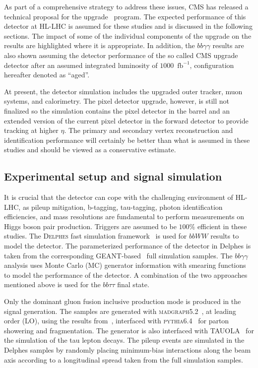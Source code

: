 As part of a comprehensive strategy to address these issues, CMS has released a technical proposal for the \phasetwo upgrade~\cite{Butler:2020886} program. The expected performance of this detector at HL-LHC is assumed for these studies and is discussed in the following sections. The impact of some of the individual components of the \phasetwo upgrade on the results are highlighted where it is appropriate. In addition, the $bb\gamma\gamma$ results are also shown assuming the detector performance of the so called \phaseone CMS upgrade~\cite{Collaboration:1355706} detector after an assumed integrated luminosity of $1000$~$\mathrm{fb}^{-1}$, configuration hereafter denoted as ``\phaseone aged''.

At present, the \phasetwo detector simulation includes the upgraded outer tracker, muon systems, and calorimetry. The pixel detector upgrade, however, is still not finalized so the simulation contains the \phaseone pixel detector in the barrel and an extended version of the current pixel detector in the forward detector to provide tracking at higher $\eta$. The primary and secondary vertex reconstruction and identification performance will certainly be better
than what is assumed in these studies and should be viewed as a conservative estimate.


\subsection{Experimental setup and signal simulation}
\label{sec:exp_cond}
It is crucial that the \phasetwo detector can cope with the challenging environment of HL-LHC, as pileup mitigation, b-tagging, tau-tagging, photon identification efficiencies, and mass 
resolutions are fundamental to perform measurements on Higgs boson pair production. Triggers are assumed to be $100\%$ efficient in these studies. The \textsc{Delphes} fast simulation framework~\cite{deFavereau:2013fsa} is used 
for $bbWW$ results to model the \phasetwo detector. The parameterized performance of the \phasetwo detector in Delphes is taken from the corresponding GEANT-based~\cite{Agostinelli:2002hh} full simulation  samples. The $bb\gamma\gamma$ analysis uses Monte Carlo (MC) generator information with smearing functions to model the performance of the detector. A combination of the two approaches mentioned above is used for the $bb\tau\tau$ final state.  

Only the dominant gluon fusion inclusive production mode is produced in the signal generation. The samples are generated with \textsc{madgraph5.2}~\cite{Alwall:2011uj}, at leading order (LO), using the results from~\cite{Frederix2014142}, interfaced with  \textsc{pythia6.4}~\cite{PYTHIA} for parton showering and fragmentation. The generator is also interfaced with TAUOLA~\cite{tauola} for the simulation of the tau lepton decays. The pileup events are simulated in the Delphes samples by randomly placing minimum-bias interactions along the beam axis according to a longitudinal spread taken from the full simulation samples.


